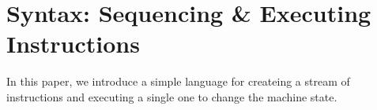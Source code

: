 \section{Syntax: Sequencing \& Executing Instructions}
\label{sec:syntax}
In this paper, we introduce a simple language for createing a stream of instructions and executing a single one to change the machine state.



